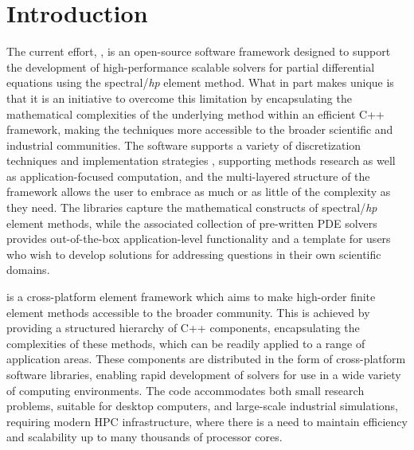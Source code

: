 \chapter{Introduction}

The current effort, \nek{} \cite{CantwellMCBRMGYLEJXMENVBKS2015}, is an open-source software framework designed to support the development of 
high-performance scalable solvers for partial differential equations using the spectral/{\em hp\/} element method.   
What in part makes \nek{} unique is that it is  
an initiative to overcome this limitation by encapsulating the mathematical complexities of the underlying method within an efficient C++ framework, making the techniques more accessible to the broader scientific and industrial communities. The software supports a variety of discretization techniques and 
implementation strategies \cite{VosSK2010,CantwellSKK2011a,CantwellSKK2011b,BolisCKS2014},
supporting methods research as well as application-focused computation, and the multi-layered structure of the framework allows the user to embrace as much or as little of the complexity as they need. The libraries capture the mathematical constructs of spectral/{\em hp\/} element methods, while the associated collection of pre-written PDE solvers provides out-of-the-box application-level functionality and a template for users who wish to develop solutions for addressing questions in their own scientific domains.

\nek{} is a cross-platform \shp{} element framework which aims to make
high-order finite element methods accessible to the broader community. This is
achieved by providing a structured hierarchy of C++ components, encapsulating
the complexities of these methods, which can be readily applied to a range of
application areas. These components are distributed in the form of
cross-platform software libraries, enabling rapid development of solvers for use
in a wide variety of computing environments. The code accommodates both
small research problems, suitable for desktop computers, and large-scale
industrial simulations, requiring modern HPC infrastructure, where
there is a need to maintain efficiency and scalability up to many thousands of
processor cores.

